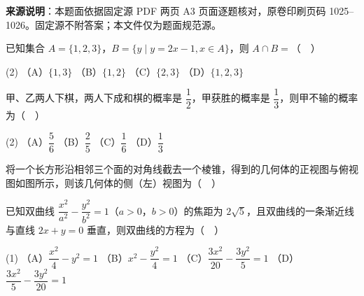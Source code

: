 


\begin{gktip}
\textbf{来源说明}：本题面依据固定源 PDF 两页 A3 页面逐题核对，原卷印刷页码 1025–1026。固定源不附答案；本文件仅为题面规范源。
\end{gktip}


\begin{question}
已知集合 \(A=\{1,2,3\}\)，\(B=\{y\mid y=2x-1,x\in A\}\)，则 \(A\cap B=\)（　）

\begin{gkopts}(2)
\task （A）\(\{1,3\}\)
\task （B）\(\{1,2\}\)
\task （C）\(\{2,3\}\)
\task （D）\(\{1,2,3\}\)
\end{gkopts}

\end{question}
\begin{question}
甲、乙两人下棋，两人下成和棋的概率是 \(\dfrac{1}{2}\)，甲获胜的概率是 \(\dfrac{1}{3}\)，则甲不输的概率为（　）

\begin{gkopts}(2)
\task （A）\(\dfrac{5}{6}\)
\task （B）\(\dfrac{2}{5}\)
\task （C）\(\dfrac{1}{6}\)
\task （D）\(\dfrac{1}{3}\)
\end{gkopts}

\Needspace{0.4\textheight}
\end{question}
\begin{question}
将一个长方形沿相邻三个面的对角线截去一个棱锥，得到的几何体的正视图与俯视图如图所示，则该几何体的侧（左）视图为（　）
\nopagebreak[4]
\begin{center}\end{center}
\nopagebreak[4]
\end{question}
\begin{question}
已知双曲线 \(\dfrac{x^{2}}{a^{2}}-\dfrac{y^{2}}{b^{2}}=1\)（\(a>0\)，\(b>0\)）的焦距为 \(2\sqrt{5}\)，且双曲线的一条渐近线与直线 \(2x+y=0\) 垂直，则双曲线的方程为（　）

\begin{gkopts}(1)
\task （A）\(\dfrac{x^{2}}{4}-y^{2}=1\)
\task （B）\(x^{2}-\dfrac{y^{2}}{4}=1\)
\task （C）\(\dfrac{3x^{2}}{20}-\dfrac{3y^{2}}{5}=1\)
\task （D）\(\dfrac{3x^{2}}{5}-\dfrac{3y^{2}}{20}=1\)
\end{gkopts}

\end{question}

